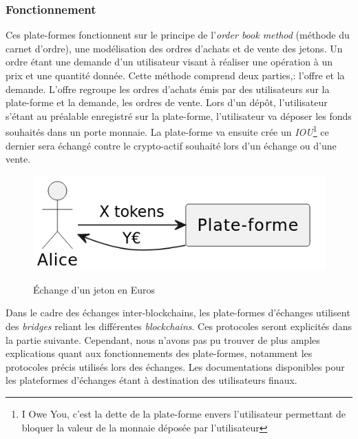\subsubsection{Fonctionnement}
Ces plate-formes fonctionnent sur le principe de l'\textit{order book method} (méthode du carnet d'ordre\cite{orderBook}), une modélisation des ordres d'achats et de vente des jetons.
Un ordre étant une demande d'un utilisateur visant à réaliser une opération à un prix et une quantité donnée. 
Cette méthode comprend deux parties,: l'offre et la demande. L'offre regroupe les ordres d'achats émis par des utilisateurs sur la plate-forme et la demande, les ordres de vente.
Lors d'un dépôt, l'utilisateur s'étant au préalable enregistré sur la plate-forme, l'utilisateur va déposer les fonds souhaités dans un porte monnaie. 
La plate-forme va ensuite crée un \textit{IOU}\footnote{I Owe You, c'est la dette de la plate-forme envers l'utilisateur permettant de bloquer la valeur de la monnaie déposée par l'utilisateur\cite{IOU}} 
ce dernier sera échangé contre le crypto-actif souhaité lors d'un échange ou d'une vente. \\ 
\begin{figure}[h!]
    \centering
    \includegraphics[scale=0.5]{centralisation/echange.png}
    \label{fig:simplifiedcex}
    \caption{Échange d'un jeton en Euros}
\end{figure}
Dans le cadre des échanges inter-blockchains, les plate-formes d'échanges utilisent des \textit{bridges} reliant les différentes \textit{blockchains}. 
Ces protocoles seront explicités dans la partie suivante.
Cependant, nous n'avons pas pu trouver de plus amples explications quant aux fonctionnements des plate-formes, notamment les protocoles précis utilisés lors des échanges. 
Les documentations disponibles pour les plateformes d'échanges étant à destination des utilisateurs finaux. 


